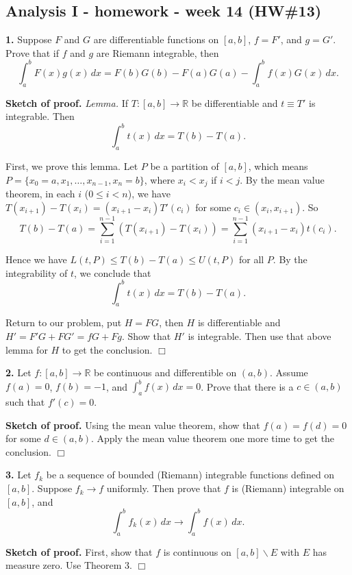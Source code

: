 \documentclass{article}
\begin{document}
    
    
    
    
    

    
    \subsection*{Analysis I - homework - week 14
(HW\#13)}\label{analysis-i---homework---week-14-hw13}

    \textbf{1.} Suppose $F$ and $G$ are differentiable functions on $[a,b]$,
$f=F'$, and $g=G'$. Prove that if $f$ and $g$ are Riemann integrable,
then
\[\int_a^b F(x)g(x) \,dx = F(b)G(b) - F(a)G(a) - \int_a^b f(x)G(x)\,dx.\]

    \textbf{Sketch of proof.} \emph{Lemma.} If $T:[a,b]\to \mathbb{R}$ be
differentiable and $t\equiv T'$ is integrable. Then
\[\int_a^b t(x) \,dx = T(b) - T(a).\]

First, we prove this lemma. Let $P$ be a partition of $[a,b]$, which
means $P = \{x_0=a,x_1,\ldots,x_{n-1},x_n=b\}$, where $x_i < x_j$ if
$i < j$. By the mean value theorem, in each $i$ ($0\le i < n$), we have
$T(x_{i+1})-T(x_i) = (x_{i+1}-x_i)T'(c_i)$ for some
$c_i \in (x_i,x_{i+1})$. So
\[T(b) - T(a) = \sum_{i=1}^{n-1}(T(x_{i+1})-T(x_i) ) = \sum_{i=1}^{n-1} (x_{i+1}-x_i)t(c_i).\]

Hence we have $L(t,P) \le T(b) -T(a) \le U(t,P)$ for all $P$. By the
integrability of $t$, we conclude that
\[\int_a^b t(x) \,dx = T(b) - T(a).\]

Return to our problem, put $H=FG$, then $H$ is differentiable and
$H'=F'G+FG' = fG + Fg$. Show that $H'$ is integrable. Then use that
above lemma for $H$ to get the conclusion. $\Box$

    \textbf{2.} Let $f:[a,b]\to \mathbb{R}$ be continuous and differentible
on $(a,b)$. Assume $f(a) = 0$, $f(b) = -1$, and $\int_a^bf(x)\,dx = 0$.
Prove that there is a $c\in (a,b)$ such that $f'(c) = 0$.

    \textbf{Sketch of proof.} Using the mean value theorem, show that
$f(a) = f(d) = 0$ for some $d\in (a,b)$. Apply the mean value theorem
one more time to get the conclusion. $\Box$

    \textbf{3.} Let $f_k$ be a sequence of bounded (Riemann) integrable
functions defined on $[a,b]$. Suppose $f_k \to f$ uniformly. Then prove
that $f$ is (Riemann) integrable on $[a,b]$, and
\[\int_a^b f_k(x)\,dx \to \int_a^b f(x) \,dx.\]

    \textbf{Sketch of proof.} First, show that $f$ is continuous on
$[a,b] \backslash E$ with $E$ has measure zero. Use Theorem 3. $\Box$
\end{document}
